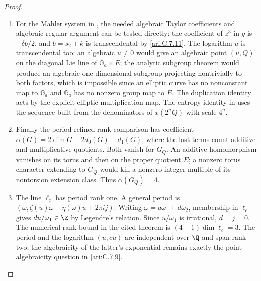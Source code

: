 \begin{proof}
\begin{enumerate}[label=\arabic*.,leftmargin=0pt,labelsep=.5em]
\begin{enumerate}[label=(\alph*),leftmargin=1.3em,labelsep=.5em]
\item  For the Mahler system in
\citep[Theorem~1.1 and system~(1.2), p.~56]{adamczewski2017mahler},
the needed algebraic Taylor coefficients and algebraic regular
argument can be tested directly: the coefficient of $z^3$ in
$g$ is $-\delta b/2$, and $b=s_2+k$ is transcendental by
\ref{ari:C.7.11}. The logarithm $u$ is transcendental too:
an algebraic $u\ne0$ would give an algebraic point $(u,Q)$
on the diagonal Lie line of $\mathbb G_a\times E$; the analytic
subgroup theorem would produce an algebraic one-dimensional
subgroup projecting nontrivially to both factors, which is
impossible since an elliptic curve has no nonconstant map to
$\mathbb G_a$ and $\mathbb G_a$ has no nonzero group map to $E$.
The duplication identity acts by the explicit elliptic
multiplication map. The entropy identity in
\citep[Theorem~5.1, author preprint, p.~9]{einsiedler2001entropy} uses the sequence
built from the denominators of $x(2^nQ)$ with scale $4^n$.


\item  Finally the period-refined rank comparison
\citep[Theorem~4.1, pp.~385--386, and Corollary~4.3, p.~386]{waldschmidt1988periodrank}
\citep[main theorem, p.~363]{roy1993periodrank}
has coefficient $\alpha(G)=2\dim G-2d_0(G)-d_1(G)$,
where the last terms count additive and multiplicative
quotients. Both vanish for $G_Q$. An additive homomorphism
vanishes on its torus and then on the proper quotient $E$;
a nonzero torus character extending to $G_Q$ would kill a
nonzero integer multiple of its nontorsion extension class.
Thus $\alpha(G_Q)=4$.


\item  The line $\ell_c$ has period rank one. A general period is
$(\omega,\zeta(u)\omega-\eta(\omega)u+2\pi i j)$.
Writing $\omega=a\omega_1+d\omega_2$, membership in
$\ell_c$ gives $du/\omega_1\in\Z$ by Legendre's relation.
Since $u/\omega_1$ is irrational, $d=j=0$. The numerical
rank bound in the cited theorem is
$(4-1)\dim\ell_c=3$. The period and the logarithm
$(u,cu)$ are independent over $\Q$ and span rank two;
the algebraicity of the latter's exponential remains exactly
the point-algebraicity question in \ref{ari:C.7.9}. \qedhere


\end{enumerate}

\end{enumerate}
\end{proof}